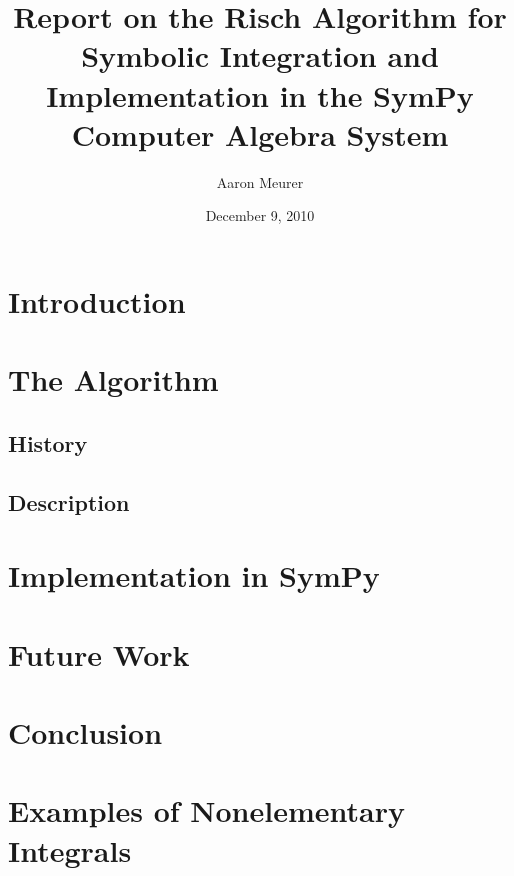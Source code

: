 \documentclass[12pt,titlepage]{article}
\newcommand{\SymPy}{Sym\-Py}
\begin{document}
\title{Report on the Risch Algorithm for Symbolic
Integration and Implementation in the Sym\-Py Computer Algebra System}
\author{Aaron Meurer}
\date{December 9, 2010}
\maketitle
%
\begin{abstract}

\end{abstract}

\tableofcontents

\section{Introduction}
\label{introduction}


\section{The Algorithm}
\subsection{History}
\label{history}


\subsection{Description}
\label{description}


\section{Implementation in \SymPy}
\label{implementation}


\section{Future Work}
\label{future}


\section{Conclusion}
\label{conclusion}


\appendix

\section{Examples of Nonelementary Integrals}
\label{nonelementary_examples_appendix}


\glsaddall
\printglossary

\nocite{*}


\end{document}

